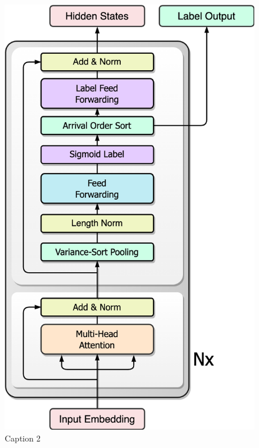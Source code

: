 \documentclass{article}
\begin{document}
\begin{figure}[ht]
\begin{minipage}[b]{0.33\textwidth}
    \includegraphics[width=0.9\linewidth]{pics/SortFormerEncoder.png}
    \caption{Caption 2}
    \label{fig:subim2}
  \end{minipage}
  \begin{minipage}[b]{0.33\textwidth}
    \centering

\end{minipage}
\end{figure}
\end{document}
